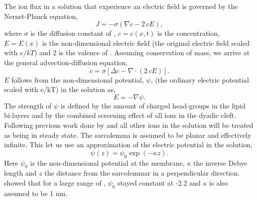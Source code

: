 The ion flux in a solution that experience an electric field is governed by the Nernst-Planck equation,
\begin{equation}
  \label{eq:nernst-planck}
  J = -\sigma\left(\nabla c-2\,cE\right),
\end{equation}
where $\sigma$ is the diffusion constant of \Ca, $c = c(x,t)$ is the \Ca concentration, $E = E(x)$ is the non-dimensional electric field (the original electric field scaled with $e/kT$) and 2 is the valence of \Ca. Assuming conservation of mass, we arrive at the general advection-diffusion equation,
\begin{equation}
  \label{eq:advection-diffusion}
  \dot{c}=\sigma\left[\Delta c - \nabla\cdot\left(2\,cE\right)\right].
\end{equation}
$E$ follows from the non-dimensional potential, $\psi$, (the ordinary electric potential scaled with e/kT) in the solution as, 
\begin{equation}
  \label{eq:electric_field}
  E=-\nabla\psi.
\end{equation}
The strength of $\psi$ is defined by the amount of charged head-groups in the lipid bi-layers and by the combined screening effect of all ions in the dyadic cleft. Following previous work done by \cite{Lang_1990_335} and \cite{Soel_1997_97} all other ions in the solution will be treated as being in steady state. The sarcolemma is assumed to be planar and effectively infinite. This let us use an approximation of the electric potential in the solution,
\begin{equation}
  \label{eq:electric_potential} \psi(z) = \psi_0\exp(-\kappa{}z).
\end{equation}
Here $\psi_0$ is the non-dimensional potential at the membrane, $\kappa$ the inverse Debye length and $z$ the distance from the sarcolemmar in a perpendicular direction. \cite{Soel_1997_97} showed that for a large range of \CaC, $\psi_0$ stayed constant at -2.2 and $\kappa$ is also assumed to be 1 nm. \par


